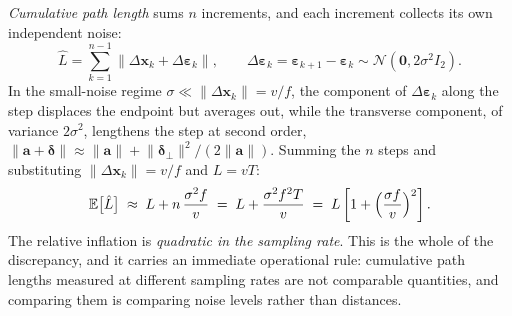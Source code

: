 \emph{Cumulative path length} sums $n$ increments, and each increment
collects its own independent noise:
\begin{equation}
\hat L=\sum_{k=1}^{n-1}\bigl\lVert \Delta\mathbf{x}_k+\Delta\boldsymbol{\varepsilon}_k\bigr\rVert,
\qquad
\Delta\boldsymbol{\varepsilon}_k=\boldsymbol{\varepsilon}_{k+1}-\boldsymbol{\varepsilon}_k
\sim\mathcal{N}(\mathbf{0},2\sigma^{2}I_2).
\label{eq:pathnoise}
\end{equation}
In the small-noise regime $\sigma\ll\lVert\Delta\mathbf{x}_k\rVert=v/f$, the
component of $\Delta\boldsymbol{\varepsilon}_k$ along the step displaces the
endpoint but averages out, while the transverse component, of variance
$2\sigma^{2}$, lengthens the step at second order,
$\lVert\mathbf{a}+\boldsymbol{\delta}\rVert\approx
\lVert\mathbf{a}\rVert+\lVert\boldsymbol{\delta}_{\perp}\rVert^{2}/(2\lVert\mathbf{a}\rVert)$.
Summing the $n$ steps and substituting $\lVert\Delta\mathbf{x}_k\rVert=v/f$
and $L=vT$:
\begin{equation}
\mathbb{E}\bigl[\hat L\bigr]\;\approx\;L+n\,\frac{\sigma^{2}f}{v}
 \;=\;L+\frac{\sigma^{2}f^{2}T}{v}
 \;=\;L\left[1+\Bigl(\frac{\sigma f}{v}\Bigr)^{2}\right].
\label{eq:pathinflation}
\end{equation}
The relative inflation is \emph{quadratic in the sampling rate}. This is the
whole of the discrepancy, and it carries an immediate operational rule:
cumulative path lengths measured at different sampling rates are not
comparable quantities, and comparing them is comparing noise levels rather
than distances.

